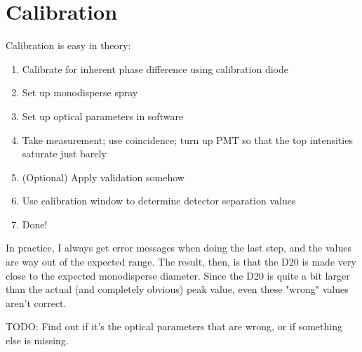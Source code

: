 \documentclass[10pt]{book}
\begin{document}
\section{Calibration}
Calibration is easy in theory:
\begin{enumerate}
    \item Calibrate for inherent phase difference using calibration diode
    \item Set up monodisperse spray
    \item Set up optical parameters in software
    \item Take measurement; use coincidence; turn up PMT so that the top
        intensities saturate just barely
    \item (Optional) Apply validation somehow
    \item Use calibration window to determine detector separation values
    \item Done!
\end{enumerate}

In practice, I always get error messages when doing the last step, and the
values are way out of the expected range. The result, then, is that the D20 is
made very close to the expected monodisperse diameter. Since the D20 is quite
a bit larger than the actual (and completely obvious) peak value, even these
"wrong" values aren't correct.

TODO: Find out if it's the optical parameters that are wrong, or if something
else is missing.



\end{document}
